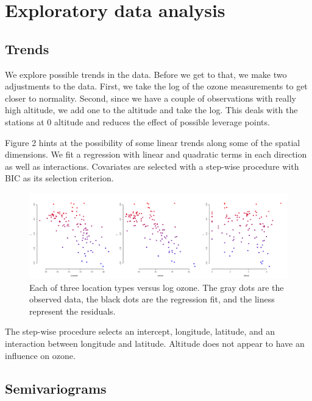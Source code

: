 \documentclass[12pt]{article}
\begin{document}

\section{Exploratory data analysis}

\subsection{Trends}

We explore possible trends in the data. Before we get to that, we make two adjustments to the data. First, we take the log of the ozone measurements to get closer to normality. Second, since we have a couple of observations with really high altitude, we add one to the altitude and take the log. This deals with the stations at 0 altitude and reduces the effect of possible leverage points.
\bigskip

Figure 2 hints at the possibility of some linear trends along some of the spatial dimensions. We fit a regression with linear and quadratic terms in each direction as well as interactions. Covariates are selected with a step-wise procedure with BIC as its selection criterion.

\begin{figure}[ht]
\begin{center}
\includegraphics[scale=0.30]{figs/trend.pdf}
\end{center}
\caption{Each of three location types versus log ozone. The gray dots are the observed data, the black dots are the regression fit, and the liness represent the residuals.}
\end{figure}

The step-wise procedure selects an intercept, longitude, latitude, and an interaction between longitude and latitude. Altitude does not appear to have an influence on ozone.
\bigskip

\subsection{Semivariograms}
\end{document}
